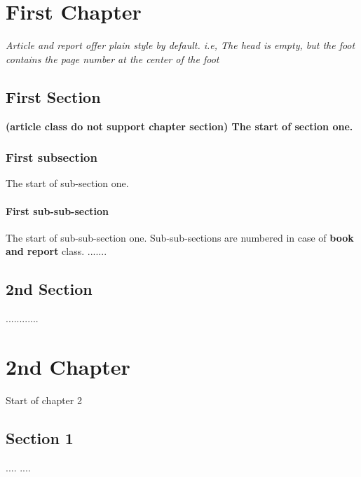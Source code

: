 \documentclass{report}
\begin{document}
    \chapter{First Chapter}
    {\huge\em Article and report offer plain style by default. i.e, The head is empty, but the foot contains the page number at the center of the foot }
	\section{First Section}
	\bfseries\huge (article class do not support  chapter section) \normalfont\normalsize The start of section one.
	\subsection{First subsection}
	The start of sub-section one.
	\subsubsection{First sub-sub-section}
	The start of sub-sub-section one. Sub-sub-sections are numbered in case of {\bf\Huge book and report} class.
	\newpage
	.......
    \newpage
    \section{2nd Section}
    ............
    \newpage
    \chapter{2nd Chapter}
    Start of chapter 2
    \section{Section 1}
    ....
    \newpage
    ....
\end{document}
